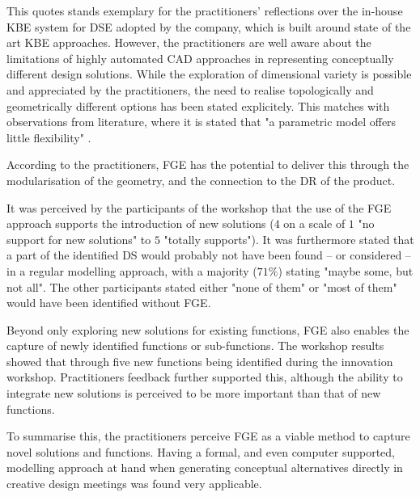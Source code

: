 \documentclass[aerospace,article,submit,moreauthors,pdftex]{Definitions/mdpi}
\begin{document}

This quotes stands exemplary for the practitioners' reflections over the in-house \ac{KBE} system for DSE adopted by the company, which is built around state of the art KBE approaches.
However, the practitioners are well aware about the limitations of highly automated CAD approaches in representing conceptually different design solutions.
While the exploration of dimensional variety is possible and appreciated by the practitioners, the need to realise topologically and geometrically different options has been stated explicitely.
This matches with observations from literature, where it is stated that "a parametric model offers little flexibility" \cite{Li2020UsingIntegration}.

According to the practitioners, FGE has the potential to deliver this through the modularisation of the geometry, and the connection to the \ac{DR} of the product.

It was perceived by the participants of the workshop that the use of the \ac{FGE} approach supports the introduction of new solutions ($4$ on a scale of $1$ "no support for new solutions" to $5$ "totally supports").
It was furthermore stated that a part of the identified \ac{DS} would probably not have been found -- or considered -- in a regular modelling approach, with a majority ($71\%$) stating "maybe some, but not all".
The other participants stated either "none of them" or "most of them" would have been identified without \ac{FGE}.

Beyond only exploring new solutions for existing functions, \ac{FGE} also enables the capture of newly identified functions or sub-functions.
The workshop results showed that through five new functions being identified during the innovation workshop.
Practitioners feedback further supported this, although the ability to integrate new solutions is perceived to be more important than that of new functions.

To summarise this, the practitioners perceive FGE as a viable method to capture novel solutions and functions.
Having a formal, and even computer  supported, modelling approach at hand when generating conceptual alternatives directly in creative design meetings was found very applicable. 
\end{document}
